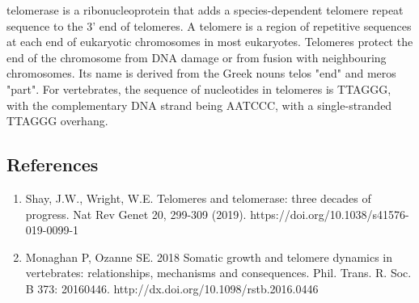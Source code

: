 \documentclass{report}
\begin{document}
telomerase is a ribonucleoprotein that adds a species-dependent telomere repeat sequence to the 3' end of telomeres.
A telomere is a region of repetitive sequences at each end of eukaryotic chromosomes in most eukaryotes.
Telomeres protect the end of the chromosome from DNA damage or from fusion with neighbouring chromosomes.
Its name is derived from the Greek nouns telos "end" and meros "part".
For vertebrates, the sequence of nucleotides in telomeres is TTAGGG, with the complementary DNA strand being AATCCC, with a single-stranded TTAGGG overhang.





\subsection*{References}
\begin{enumerate}
    \item Shay, J.W., Wright, W.E. Telomeres and telomerase: three decades of progress. Nat Rev Genet 20, 299-309 (2019). https://doi.org/10.1038/s41576-019-0099-1
    \item Monaghan P, Ozanne SE.
    2018 Somatic growth and telomere dynamics
    in vertebrates: relationships, mechanisms and
    consequences. Phil. Trans. R. Soc. B 373:
    20160446.
    http://dx.doi.org/10.1098/rstb.2016.0446



\end{enumerate}
\end{document}
